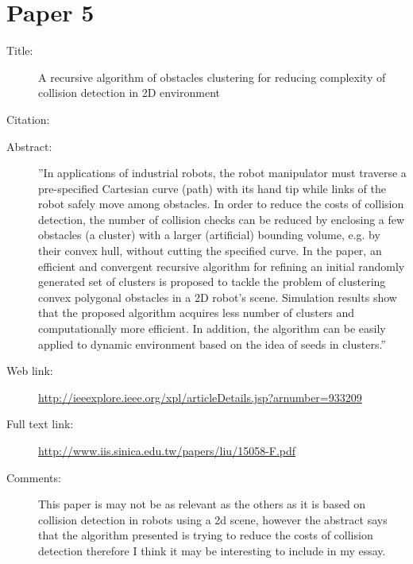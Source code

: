 \documentclass{scrartcl}
\begin{document}
\section*{Paper 5}
\begin{description}
	\item[Title:] A recursive algorithm of obstacles clustering for reducing complexity of collision detection in 2D environment
	\item[Citation:] \cite{Chen}
	\item[Abstract:] ''In applications of industrial robots, the robot manipulator must traverse a pre-specified Cartesian curve (path) with its hand tip while links of the robot safely move among obstacles. In order to reduce the costs of collision detection, the number of collision checks can be reduced by enclosing a few obstacles (a cluster) with a larger (artificial) bounding volume, e.g. by their convex hull, without cutting the specified curve. In the paper, an efficient and convergent recursive algorithm for refining an initial randomly generated set of clusters is proposed to tackle the problem of clustering convex polygonal obstacles in a 2D robot's scene. Simulation results show that the proposed algorithm acquires less number of clusters and computationally more efficient. In addition, the algorithm can be easily applied to dynamic environment based on the idea of seeds in clusters.''
	\item[Web link:] \url{http://ieeexplore.ieee.org/xpl/articleDetails.jsp?arnumber=933209}
	\item[Full text link:] \url{http://www.iis.sinica.edu.tw/papers/liu/15058-F.pdf}
	\item[Comments:] This paper is may not be as relevant as the others as it is based on collision detection in robots using a 2d scene, however the abstract says that the algorithm presented is trying to reduce the costs of collision detection therefore I think it may be interesting to include in my essay. 
\end{description}



\end{document}
